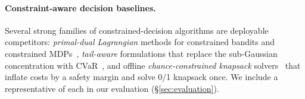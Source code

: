 \paragraph{Constraint-aware decision baselines.}
Several strong families of constrained-decision algorithms are
deployable competitors: \emph{primal-dual Lagrangian} methods for
constrained bandits and constrained MDPs~\cite{mahdavi2012tradeoff,agrawal2014bwk}, \emph{tail-aware} formulations that replace the
sub-Gaussian concentration with CVaR~\cite{tamkin2020cvar}, and
offline \emph{chance-constrained knapsack}
solvers~\cite{kleinberg2000stochasticpacking} that inflate costs by a
safety margin and solve 0/1 knapsack once. We include a representative
of each in our evaluation (\S\ref{sec:evaluation}).

